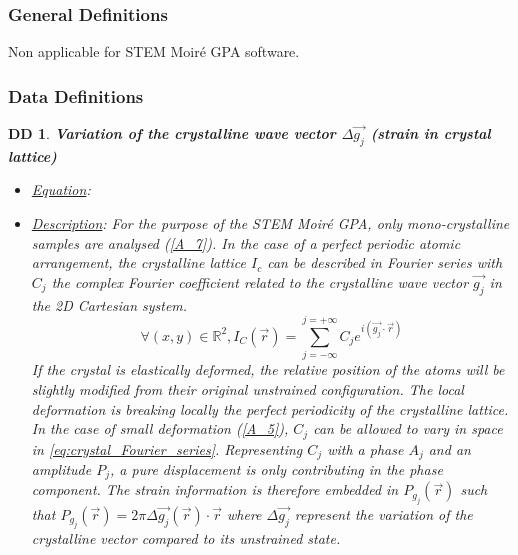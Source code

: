 \documentclass[12pt]{article}
\newcommand{\progname}{STEM Moir{\'e} GPA}
\newtheorem{DD}{DD}
\begin{document}
\subsubsection{General Definitions}\label{sec_gendef}

Non applicable for \progname{} software.

\subsubsection{Data Definitions}\label{sec_datadef}

\renewcommand{\labelitemi}{$\star$}

\begin{DD}
\label{DD_1}
\noindent\colorbox{shadecolorDD}{\normalfont \textbf{Variation of the crystalline wave vector $\Delta \overrightarrow{g_j}$ (strain in crystal lattice)}}
\normalfont
\begin{itemize}
\item \underline{Equation}: 
\item \underline{Description}: For the purpose of the STEM Moir{\'e} GPA, only mono-crystalline samples are analysed (\cref{A_7}). In the case of a perfect periodic atomic arrangement, the crystalline lattice $I_c$ can be described in Fourier series with $C_j$ the complex Fourier coefficient related to the crystalline wave vector $\vec{g_j}$ in the 2D Cartesian system.
\begin{equation}
\forall (x,y) \in \mathbb{R}^{2},I_C(\vec{r})=\sum_{j=-\infty}^{j=+\infty}C_je^{i(\vec{g_j}\cdot\vec{r})}
\label{eq:crystal_Fourier_series}
\end{equation}
If the crystal is elastically deformed, the relative position of the atoms will be slightly modified from their original unstrained configuration. The local deformation is breaking locally the perfect periodicity of the crystalline lattice. In the case of small deformation (\cref{A_5}), $C_j$ can be allowed to vary in space in \cref{eq:crystal_Fourier_series}. Representing $C_j$ with a phase $A_j$ and an amplitude $P_j$, a pure displacement is only contributing in the phase component. The strain information is therefore embedded in $P_{g_{j}}(\vec{r})$ such that $P_{g_{j}}(\vec{r})=2\pi\Delta \overrightarrow{g_{j}}(\vec{r})\cdot\vec{r}$ where $\Delta \overrightarrow{g_j}$ represent the variation of the crystalline vector compared to its unstrained state.
\begin{equation}

\end{equation}
\end{itemize}
\end{DD}
\end{document}
